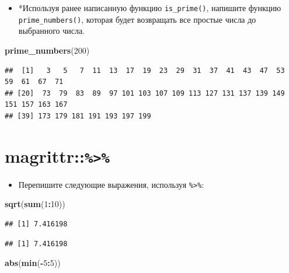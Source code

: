\documentclass[]{book}
\newenvironment{Shaded}{\begin{snugshade}}{\end{snugshade}}
\newcommand{\KeywordTok}[1]{\textcolor[rgb]{0.13,0.29,0.53}{\textbf{#1}}}
\newcommand{\DecValTok}[1]{\textcolor[rgb]{0.00,0.00,0.81}{#1}}
\newcommand{\OperatorTok}[1]{\textcolor[rgb]{0.81,0.36,0.00}{\textbf{#1}}}
\newcommand{\NormalTok}[1]{#1}
\providecommand{\tightlist}{%
  \setlength{\itemsep}{0pt}\setlength{\parskip}{0pt}}
\begin{document}
\begin{itemize}
\tightlist
\item
  *Используя ранее написанную функцию \texttt{is\_prime()}, напишите
  функцию \texttt{prime\_numbers()}, которая будет возвращать все
  простые числа до выбранного числа.
\end{itemize}

\begin{Shaded}
\begin{Highlighting}[]
\KeywordTok{prime_numbers}\NormalTok{(}\DecValTok{200}\NormalTok{)}
\end{Highlighting}
\end{Shaded}

\begin{verbatim}
##  [1]   3   5   7  11  13  17  19  23  29  31  37  41  43  47  53  59  61  67  71
## [20]  73  79  83  89  97 101 103 107 109 113 127 131 137 139 149 151 157 163 167
## [39] 173 179 181 191 193 197 199
\end{verbatim}

\section{\texorpdfstring{magrittr::\texttt{\%\textgreater{}\%}}{magrittr::\%\textgreater{}\%}}\label{task_pipe}

\begin{itemize}
\tightlist
\item
  Перепишите следующие выражения, используя \texttt{\%\textgreater{}\%}:
\end{itemize}

\begin{Shaded}
\begin{Highlighting}[]
\KeywordTok{sqrt}\NormalTok{(}\KeywordTok{sum}\NormalTok{(}\DecValTok{1}\OperatorTok{:}\DecValTok{10}\NormalTok{))}
\end{Highlighting}
\end{Shaded}

\begin{verbatim}
## [1] 7.416198
\end{verbatim}

\begin{verbatim}
## [1] 7.416198
\end{verbatim}

\begin{Shaded}
\begin{Highlighting}[]
\KeywordTok{abs}\NormalTok{(}\KeywordTok{min}\NormalTok{(}\OperatorTok{-}\DecValTok{5}\OperatorTok{:}\DecValTok{5}\NormalTok{))}
\end{Highlighting}
\end{Shaded}
\end{document}

